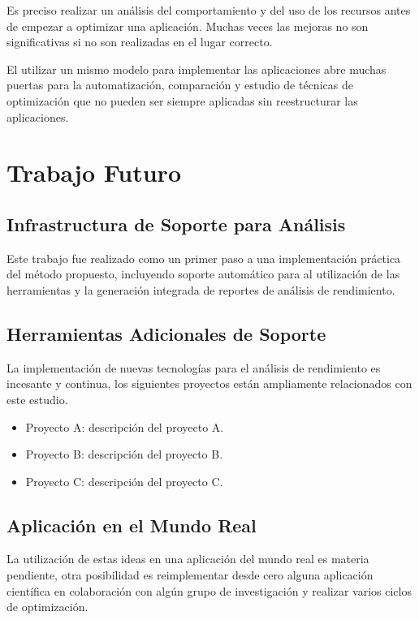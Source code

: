 \documentclass[a4paper]{report}
\begin{document}
\bigskip

Es preciso realizar un an\'alisis del comportamiento y del uso de los recursos antes de
empezar a optimizar una aplicaci\'on. Muchas veces las mejoras no son significativas si no
son realizadas en el lugar correcto.

\bigskip

El utilizar un mismo modelo para implementar las aplicaciones abre muchas puertas para
la automatizaci\'on, comparaci\'on y estudio de t\'ecnicas de optimizaci\'on que no pueden
ser siempre aplicadas sin reestructurar las aplicaciones.

\chapter{Trabajo Futuro}

\section{Infrastructura de Soporte para An\'alisis}

Este trabajo fue realizado como un primer paso a una implementaci\'on pr\'actica del m\'etodo propuesto,
incluyendo soporte autom\'atico para al utilizaci\'on de las herramientas y la generaci\'on integrada de
reportes de an\'alisis de rendimiento.

\section{Herramientas Adicionales de Soporte}

La implementaci\'on de nuevas tecnolog\'ias para el an\'alisis de rendimiento
es incesante y continua, los siguientes proyectos est\'an ampliamente
relacionados con este estudio.

\begin{itemize}
\item Proyecto A: descripci\'on del proyecto A.
\item Proyecto B: descripci\'on del proyecto B.
\item Proyecto C: descripci\'on del proyecto C.
\end{itemize}

\section{Aplicaci\'on en el Mundo Real}

La utilizaci\'on de estas ideas en una aplicaci\'on del mundo real es materia
pendiente, otra posibilidad es reimplementar desde cero alguna aplicaci\'on
cient\'ifica en colaboraci\'on con alg\'un grupo de investigaci\'on y realizar
varios ciclos de optimizaci\'on.
\end{document}
